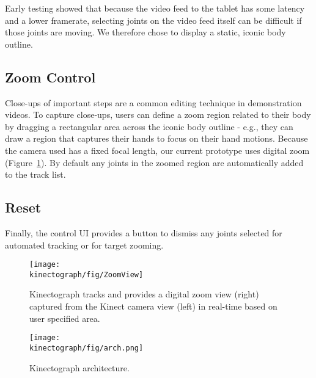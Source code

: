 Early testing showed that because the video feed to the tablet has some latency and a lower framerate, selecting joints on the video feed itself can be difficult if those joints are moving. We therefore chose to display a static, iconic body outline.


\subsection{Zoom Control}
Close-ups of important steps are a common editing technique in demonstration videos. To capture close-ups, users can define a zoom region related to their body by dragging a rectangular area across the iconic body outline - e.g., they can draw a region that captures their hands to focus on their hand motions. Because the camera used has a fixed focal length, our current prototype uses digital zoom (Figure~\ref{fig:ZoomView}). By default any joints in the zoomed region are automatically added to the track list.

\subsection{Reset}
Finally, the control UI provides a button to dismiss any joints selected for automated tracking or for target zooming.

\begin{figure}[t]
\centering
\texttt{[image: \\kinectograph/fig/ZoomView]}
\caption{Kinectograph tracks and provides a digital zoom view (right) captured from the Kinect camera view (left) in real-time based on user specified area.}
\label{fig:ZoomView}
\end{figure}

\begin{figure}[t]
\centering
\texttt{[image: \\kinectograph/fig/arch.png]}
\caption{Kinectograph architecture.}
\label{fig:architecture}
\end{figure}
